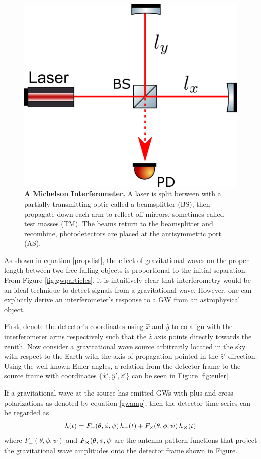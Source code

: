 	\begin{figure}[ht]
		\centering
		\includegraphics[width=.45 \textwidth]{../Figures/SimpleMichelson.png}
		\caption[A Michelson Interferometer.]  
		{\textbf{A Michelson Interferometer.} A laser is split between with a partially transmitting optic called a beamsplitter (BS), then propagate down each arm to reflect off mirrors, sometimes called test masses (TM).  The beams return to the beamsplitter and recombine, photodetectors are placed at the antisymmetric port (AS).   }
		\label{fig:simple_michelson}
	\end{figure}
	As shown in equation \ref{propdist}, the effect of gravitational waves on the proper length between two free falling objects is proportional to the initial separation.  From Figure \ref{fig:gwparticles}, it is intuitively clear that interferometry would be an ideal technique to detect signals from a gravitational wave.  However, one can explicitly derive an interferometer's response to a GW from an astrophysical object.
	
	First, denote the detector's coordinates using $\hat{x}$ and $\hat{y}$ to co-align with the interferometer arms respectively such that the $\hat{z}$ axis points directly towards the zenith. Now consider a gravitational wave source arbitrarily located in the sky with respect to the Earth with the axis of propagation pointed in the $\hat{z}'$ direction.  Using the well known Euler angles, a relation from the detector frame to the source frame with coordinates $\{\hat{x}',\hat{y}',\hat{z}'\}$ can be seen in Figure \ref{fig:euler}. 
	
	If a gravitational wave at the source has emitted GWs with plus and cross polarizations as denoted by equation \ref{gwamp}, then the detector time series can be regarded as \cite{S6sensitivity} \cite{Finn:1995}
	\begin{equation}
	h(t) = F_{+}(\theta,\phi,\psi) \, h_{+}(t) + F_{\times}(\theta,\phi,\psi) \, h_{\cross}(t)
	\end{equation}
	where $F_{+}(\theta,\phi,\psi)$ and $F_{\cross}(\theta,\phi,\psi$ are the antenna pattern functions that project the gravitational wave amplitudes onto the detector frame shown in Figure.
	

